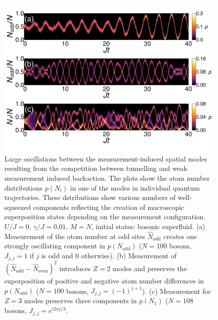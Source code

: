 \begin{figure}[htbp!]
  \centering
  \includegraphics[width=\textwidth]{Oscillations}
  \caption[Macroscopic Oscillations due to Weak Measurement]{Large
    oscillations between the measurement-induced spatial modes
    resulting from the competition between tunnelling and weak
    measurement induced backaction. The plots show the atom number
    distributions $p(N_l)$ in one of the modes in individual quantum
    trajectories. These dstributions show various numbers of
    well-squeezed components reflecting the creation of macroscopic
    superposition states depending on the measurement
    configuration. $U/J = 0$, $\gamma/J = 0.01$, $M=N$, initial
    states: bosonic superfluid. (a) Measurement of the atom number at
    odd sites $\hat{N}_\mathrm{odd}$ creates one strongly oscillating
    component in $p(N_\mathrm{odd})$ ($N = 100$ bosons, $J_{j,j} = 1$
    if $j$ is odd and 0 otherwise). (b) Measurement of
    $(\hat{N}_\mathrm{odd} - \hat{N}_\mathrm{even})^2$ introduces
    $Z = 2$ modes and preserves the superposition of positive and
    negative atom number differences in $p(N_\mathrm{odd})$ ($N = 100$
    bosons, $J_{j,j} = (-1)^{j+1}$). (c) Measurement for $Z = 3$ modes
    preserves three components in $p(N_1)$ ($N = 108$ bosons,
    $J_{j,j} = e^{i 2 \pi j / 3}$.}
  \label{fig:oscillations}
\end{figure}

